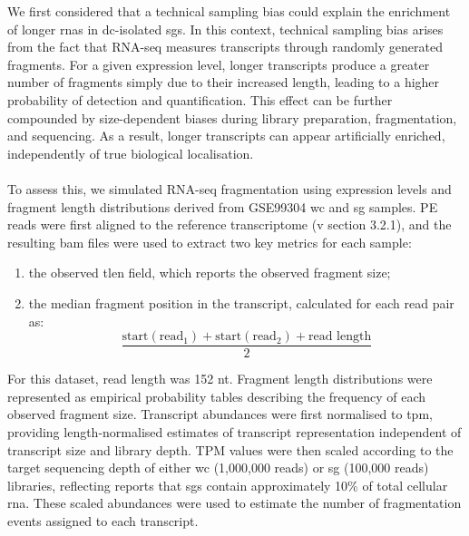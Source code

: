 We first considered that a technical sampling bias could explain the enrichment of longer \gls{rna}s in \gls{dc}-isolated \gls{sg}s. In this context, technical sampling bias arises from the fact that RNA-seq measures transcripts through randomly generated fragments\cite{chu_rna_2012}. For a given expression level, longer transcripts produce a greater number of fragments simply due to their increased length, leading to a higher probability of detection and quantification\cite{chu_rna_2012}. This effect can be further compounded by size-dependent biases during library preparation, fragmentation, and sequencing\cite{chu_rna_2012}. As a result, longer transcripts can appear artificially enriched, independently of true biological localisation.
\\
\\
To assess this, we simulated RNA-seq fragmentation using expression levels and fragment length distributions derived from GSE99304\cite{khong_stress_2017} \gls{wc} and \gls{sg} samples. PE reads were first aligned to the reference transcriptome (\gls{v} section 3.2.1), and the resulting \gls{bam} files were used to extract two key metrics for each sample:
\begin{enumerate}
	\item the observed \gls{tlen} field, which reports the observed fragment size;
	\item the median fragment position in the transcript, calculated for each read pair as:
	\begin{equation}
		\frac{\text{start}(\text{read}_1) + \text{start}(\text{read}_2) + \text{read length}}{2}
	\end{equation}
\end{enumerate}
\noindent
For this dataset, read length was 152 \gls{nt}. Fragment length distributions were represented as empirical probability tables describing the frequency of each observed fragment size. Transcript abundances were first normalised to \gls{tpm}, providing length-normalised estimates of transcript representation independent of transcript size and library depth. TPM values were then scaled according to the target sequencing depth of either \gls{wc} (1,000,000 reads) or \gls{sg} (100,000 reads) libraries, reflecting reports that \gls{sg}s contain approximately 10\% of total cellular \gls{rna}\cite{khong_stress_2017}. These scaled abundances were used to estimate the number of fragmentation events assigned to each transcript.
\\
\\

